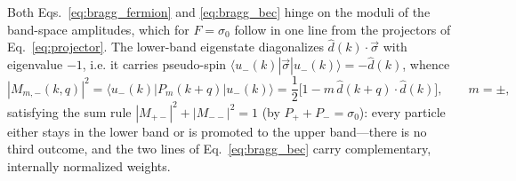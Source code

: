 \documentclass[onecolumn,aps,prl,superscriptaddress,longbibliography]{revtex4-2}
\begin{document}
Both Eqs.~\eqref{eq:bragg_fermion} and \eqref{eq:bragg_bec} hinge on the moduli of the band-space amplitudes, which for $F=\sigma_0$ follow in one line from the projectors of Eq.~\eqref{eq:projector}. The lower-band eigenstate diagonalizes $\hat d(k)\cdot\vec\sigma$ with eigenvalue $-1$, i.e. it carries pseudo-spin $\langle u_-(k)|\vec\sigma|u_-(k)\rangle=-\hat d(k)$, whence
\begin{equation}\label{eq:bragg_weight}
  |M_{m,-}(k,q)|^2 = \langle u_-(k)|P_m(k+q)|u_-(k)\rangle = \frac{1}{2}\Big[1-m\,\hat d(k+q)\cdot\hat d(k)\Big],
  \qquad m=\pm,
\end{equation}
satisfying the sum rule $|M_{+-}|^2+|M_{--}|^2=1$ (by $P_++P_-=\sigma_0$): every particle either stays in the lower band or is promoted to the upper band---there is no third outcome, and the two lines of Eq.~\eqref{eq:bragg_bec} carry complementary, internally normalized weights.
\end{document}
